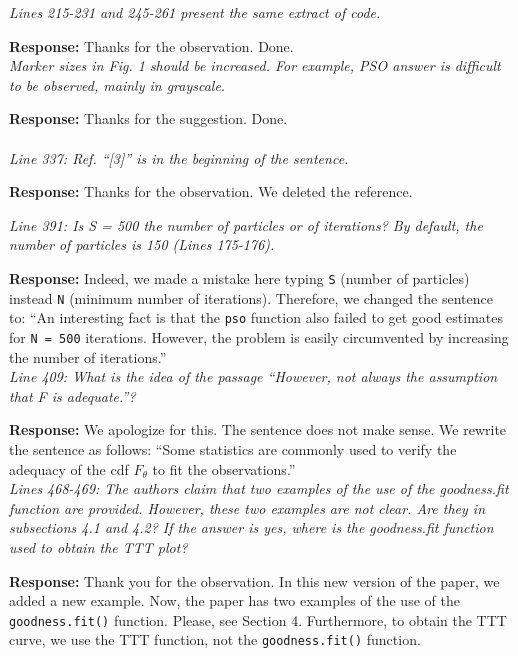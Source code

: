 \documentclass[a4paper,11pt]{exam}
\begin{document}
\begin{questions}
\question \textit{Lines 215-231 and 245-261 present the same extract of code.}

\noindent \textbf{Response:} Thanks for the observation. Done.\\

\question \textit{Marker sizes in Fig. 1 should be increased. For example, PSO answer is difficult to be observed, mainly in grayscale.}

\noindent \textbf{Response:} Thanks for the suggestion. Done.\\\\

\question \textit{Line 337: Ref. “[3]” is in the beginning of the sentence.}

\noindent \textbf{Response:} Thanks for the observation. We deleted the reference.

\question \textit{Line 391: Is S = 500 the number of particles or of iterations? By default, the number of particles is 150 (Lines 175-176).}

\noindent \textbf{Response:} Indeed, we made a mistake here typing \texttt{S} (number of particles) instead \texttt{N} (minimum number of iterations).  Therefore, we changed the sentence to: ``An interesting fact is that the \texttt{pso} function also failed to get good estimates for \texttt{N = 500} iterations. However, the problem is easily circumvented by increasing the number of iterations.''\\

\question \textit{Line 409: What is the idea of the passage “However, not always the assumption that F is adequate.”?}

\noindent \textbf{Response:} We apologize for this. The sentence does not make sense. We rewrite the sentence as follows: ``Some statistics are commonly used to verify the adequacy of the cdf $F_\theta$ to fit the observations.''\\

\question \textit{Lines 468-469: The authors claim that two examples of the use of the goodness.fit function are provided. However, these two examples are not clear. Are they in subsections 4.1 and 4.2? If the answer is yes, where is the goodness.fit function used to obtain the TTT plot?}

\noindent \textbf{Response:} Thank you for the observation. In this new version of the paper, we added a new example. Now, the paper has two examples of the use of the \texttt{goodness.fit()} function. Please, see Section 4. Furthermore, to obtain the TTT curve, we use the TTT function, not the \texttt{goodness.fit()} function.\\


\end{questions}
\end{document}
